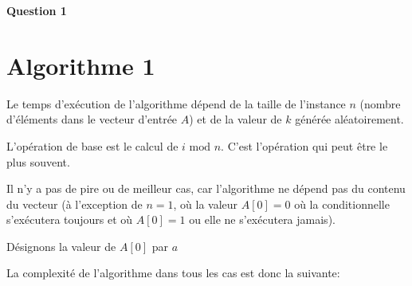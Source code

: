 \documentclass[class=article]{standalone}
\begin{document}
\centerline{\Huge \bf Question 1}
\bigskip

\section*{Algorithme 1}

Le temps d'exécution de l'algorithme dépend de la taille de l'instance $n$ 
(nombre d'éléments dans le vecteur d'entrée $A$)
et de la valeur de $k$ générée aléatoirement. 

L'opération de base est le calcul de $i\text{ mod }n$. 
C'est l'opération qui peut être le plus souvent.

Il n'y a pas de pire ou de meilleur cas, 
car l'algorithme ne dépend pas du contenu du vecteur (à l'exception de $n=1$,
où la valeur $A[0]=0$ où la conditionnelle s'exécutera toujours et où $A[0] = 1$ ou elle ne s'exécutera jamais).

Désignons la valeur de $A[0]$ par $a$

La complexité de l'algorithme dans tous les cas est donc la suivante:
\end{document}
